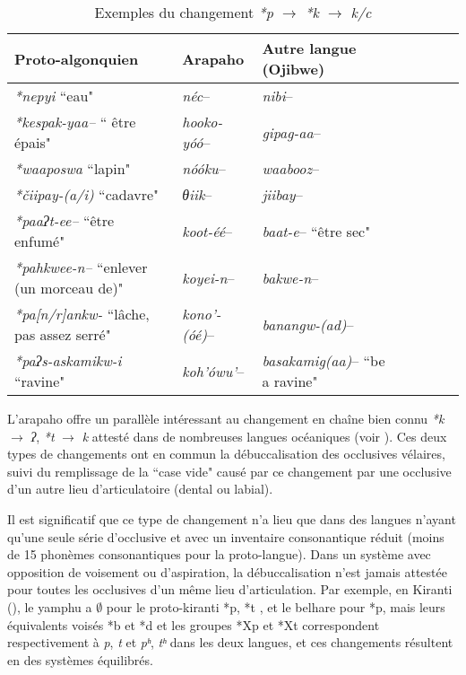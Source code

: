 \documentclass[twoside,a4paper,11pt]{article}
\newcommand{\ipa}[1]{{\phon\textit{#1}}}
\newcommand{\Σ}{\greek{Σ}}
\begin{document}
 \begin{table}[h]
\caption{Exemples du changement \ipa{*p} $\rightarrow$ \ipa{*k} $\rightarrow$  \ipa{k/c}} \centering  \label{tab:p.k}
\begin{tabular}{lllllll}
\toprule
Proto-algonquien & Arapaho & Autre langue (Ojibwe)\\
\midrule
  \ipa{*nepyi} ``eau" & \textit{néc}--    &  \textit{nibi}-- \\
 \ipa{*kespak-yaa--} `` être épais" & \textit{hooko-yóó}--    &  \textit{gipag-aa}-- \\
 \ipa{*waaposwa} ``lapin" & \textit{nóóku}--    &  \textit{waabooz}-- \\
  \ipa{*čiipay-(a/i)} ``cadavre" & \textit{θiik}--    &  \textit{jiibay}-- \\
  \ipa{*paaʔt-ee--} ``être enfumé" & \textit{koot-éé}--    &  \textit{baat-e}-- ``être sec"\\
    \ipa{*pahkwee-n--} ``enlever (un morceau de)" & \textit{koyei-n}--    &  \textit{bakwe-n}-- \\
        \ipa{*pa[n/r]ankw-} ``lâche, pas assez serré" & \textit{kono'-(óé)}--    &  \textit{banangw-(ad)}-- \\ 
   \ipa{*paʔs-askamikw-i} ``ravine" & \textit{koh'ówu'}--    &  \textit{basakamig(aa)}-- ``be a ravine"\\ 
\bottomrule
\end{tabular}
\end{table}

L'arapaho offre un parallèle intéressant au changement en chaîne bien connu \ipa{*k} $\rightarrow$ \ipa{ʔ},  \ipa{*t} $\rightarrow$ \ipa{k}  attesté dans de nombreuses langues océaniques (voir \citealt{blust04tk}). Ces deux types de changements ont en commun la débuccalisation des occlusives vélaires, suivi du remplissage de la ``case vide" causé par ce changement par une occlusive d'un autre lieu d'articulatoire (dental ou labial). 


Il est significatif que ce type de changement n'a lieu que dans des langues n'ayant qu'une seule série d'occlusive et avec un inventaire consonantique réduit (moins de 15 phonèmes consonantiques pour la proto-langue). Dans un système avec opposition de voisement ou d'aspiration, la débuccalisation n'est jamais attestée pour toutes les occlusives d'un même lieu d'articulation. Par exemple, en Kiranti (\citealt{michailovsky94stops}), le yamphu a $\emptyset$ pour le proto-kiranti *p, *t , et le belhare pour  *p, mais leurs équivalents voisés *b et *d et les groupes *Xp et *Xt correspondent respectivement à \ipa{p}, \ipa{t} et \ipa{pʰ}, \ipa{tʰ} dans les deux langues, et ces changements résultent en des systèmes équilibrés.
\end{document}
